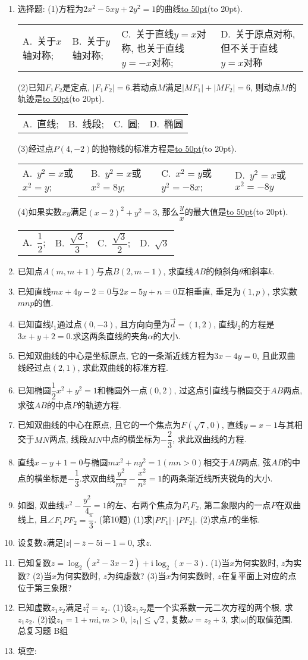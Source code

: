 \documentclass[10pt,a4paper]{article}
\newcommand{\blank}[1]{\underline{\hbox to #1pt{}}}
\newcommand{\bracket}[1]{(\hbox to #1pt{})}
\newcommand{\fourch}[4]{\par\begin{tabular}{p{.23\textwidth}p{.23\textwidth}p{.23\textwidth}p{.23\textwidth}}
A.~#1 &B.~#2& C.~#3& D.~#4
\end{tabular}}
\begin{document}
\begin{enumerate}[1.]
\item 选择题:
(1)方程为$2x^2-5xy+2y^2=1$的曲线\blank{50}\bracket{20}.
\fourch{关于$x$轴对称;}{关于$y$轴对称;}{关于直线$y=x$对称, 也关于直线$y=-x$对称;}{关于原点对称, 但不关于直线$y=x$对称}
(2)已知$F_1F_2$是定点, $|F_1F_2|=6$.若动点$M$满足$|MF_1|+|MF_2|=6$, 则动点$M$的轨迹是\blank{50}\bracket{20}.
\fourch{直线;}{线段;}{圆;}{椭圆}
(3)经过点$P(4,-2)$的抛物线的标准方程是\blank{50}\bracket{20}.
\fourch{$y^2=x$或$x^2=y$;}{$y^2=x$或$x^2=8y$;}{$x^2=y$或$y^2=-8x$;}{$y^2=x$或$x^2=-8y$}
(4)如果实数$xy$满足$(x-2)^2+y^2=3$, 那么$\dfrac yx$的最大值是\blank{50}\bracket{20}.
\fourch{$\dfrac 12$;}{$\dfrac{\sqrt 3}3$;}{$\dfrac{\sqrt 3}2$;}{$\sqrt 3$}
\item 已知点$A(m,m+1)$与点$B(2,m-1)$, 求直线$AB$的倾斜角$\theta$和斜率$k$.
\item 已知直线$mx+4y-2=0$与$2x-5y+n=0$互相垂直, 垂足为$(1,p)$, 求实数$mnp$的值.
\item 已知直线$l_1$通过点$(0,-3)$, 且方向向量为$\overrightarrow d=(1,2)$, 直线$l_2$的方程是$3x+y+2=0$.求这两条直线的夹角$\alpha$的大小.
\item 已知双曲线的中心是坐标原点, 它的一条渐近线方程为$3x-4y=0$, 且此双曲线经过点$(2,1)$, 求此双曲线的标准方程.
\item 已知椭圆$\dfrac 12x^2+y^2=1$和椭圆外一点$(0,2)$, 过这点引直线与椭圆交于$AB$两点, 求弦$AB$的中点$P$的轨迹方程.
\item 已知双曲线的中心在原点, 且它的一个焦点为$F(\sqrt 7,0)$, 直线$y=x-1$与其相交于$MN$两点, 线段$MN$中点的横坐标为$-\dfrac 23$, 求此双曲线的方程.
\item 直线$x-y+1=0$与椭圆$mx^2+ny^2=1(mn>0)$相交于$AB$两点, 弦$AB$的中点的横坐标是$-\dfrac 13$.求双曲线$\dfrac{y^2}{m^2}-\dfrac{x^2}{n^2}=1$的两条渐近线所夹锐角的大小.
\item 如图, 双曲线$x^2-\dfrac{y^2}4=1$的左、右两个焦点为$F_1F_2$, 第二象限内的一点$P$在双曲线上, 且$\angle F_1PF_2=\dfrac{\pi }3$.
(第10题)
(1)求$|PF_1|\cdot|PF_2|$.
(2)求点$P$的坐标.
\item 设复数$z$满足$|z|-\overline  z-5\mathrm{i}-1=0$, 求$z$.
\item 已知复数$z=\log _2(x^2-3x-2)+\mathrm{i}\log _2(x-3)$.
(1)当$x$为何实数时, $z$为实数?
(2)当$x$为何实数时, $z$为纯虚数?
(3)当$x$为何实数时, $z$在复平面上对应的点位于第三象限?
\item 已知虚数$z_1z_2$满足$z_1^2=z_2$.
(1)设$z_1z_2$是一个实系数一元二次方程的两个根, 求$z_1z_2$.
(2)设$z_1=1+m\mathrm{i},m>0$, $|z_1|\le \sqrt 2$, 复数$\omega =z_2+3$, 求$|\omega|$的取值范围.
总复习题
B组
\item 填空:

\end{enumerate}
\end{document}
